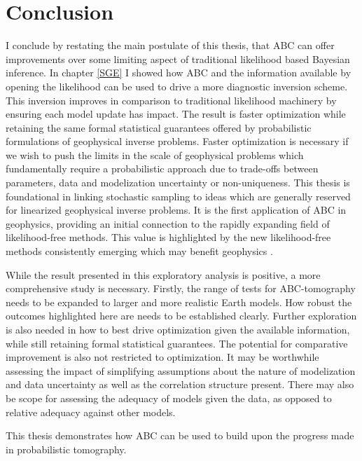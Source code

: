 

\chapter{Conclusion}

I conclude by restating the main postulate of this thesis, that ABC can offer improvements over some limiting aspect of traditional likelihood based Bayesian inference. In chapter \ref{SGE} I showed how ABC and the information available by opening the likelihood can be used to drive a more diagnostic inversion scheme. This inversion improves in comparison to traditional likelihood machinery by ensuring each model update has impact. The result is faster optimization while retaining the same formal statistical guarantees offered by probabilistic formulations of geophysical inverse problems.  Faster optimization is necessary if we wish to push the limits in the scale of geophysical problems which fundamentally require a probabilistic approach due to trade-offs between parameters, data and modelization uncertainty or non-uniqueness. This thesis is foundational in linking stochastic sampling to ideas which are generally reserved for linearized geophysical inverse problems. It is the first application of ABC in geophysics, providing an initial connection to the rapidly expanding field of likelihood-free methods. This value is highlighted by the new likelihood-free methods consistently emerging which may benefit geophysics \citep{papamakarios2016fast,song2017nice}.\par

While the result presented in this exploratory analysis is positive, a more comprehensive study is necessary. Firstly, the range of tests for ABC-tomography needs to be expanded to larger and more realistic Earth models. How robust the outcomes highlighted here are needs to be established clearly. Further exploration is also needed in how to best drive optimization given the available information, while still retaining formal statistical guarantees. The potential for comparative improvement is also not restricted to optimization. It may be worthwhile assessing the impact of simplifying assumptions about the nature of modelization and data uncertainty as well as the correlation structure present. There may also be scope for assessing the adequacy of models given the data, as opposed to relative adequacy against other models. \par
This thesis demonstrates how ABC can be used to build upon the progress made in probabilistic tomography. 
